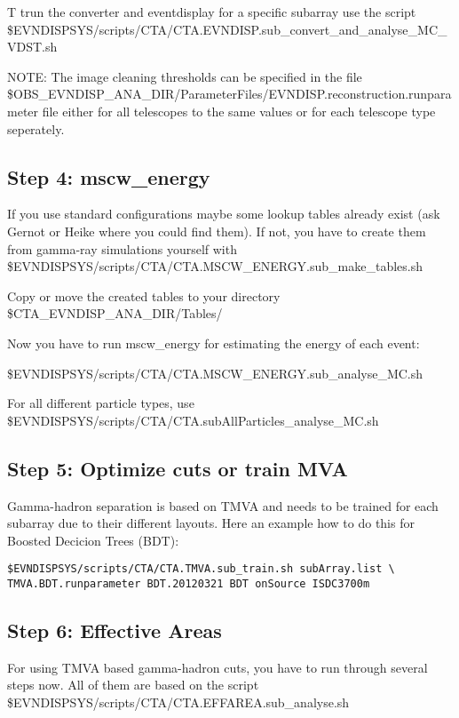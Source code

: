 \documentclass[titlepage,a4paper,twoside,11pt]{report}
\begin{document}
T trun the converter and eventdisplay for a specific subarray use the script \$EVNDISPSYS/scripts/CTA/CTA.EVNDISP.sub\_convert\_and\_analyse\_MC\_VDST.sh

NOTE: The image cleaning thresholds can be specified in the file \$OBS\_EVNDISP\_ANA\_DIR/ParameterFiles/EVNDISP.reconstruction.runparameter file either
for all telescopes to the same values or for each telescope type seperately. 

\subsection{Step 4: mscw\_energy}

If you use standard configurations maybe some lookup tables already exist (ask Gernot or Heike where you could find them).
If not, you have to create them from gamma-ray simulations yourself
with \$EVNDISPSYS/scripts/CTA/CTA.MSCW\_ENERGY.sub\_make\_tables.sh

Copy or move the created tables to your directory 
\$CTA\_EVNDISP\_ANA\_DIR/Tables/

Now you have to run mscw\_energy for estimating the energy of each
event: 

\$EVNDISPSYS/scripts/CTA/CTA.MSCW\_ENERGY.sub\_analyse\_MC.sh

For all different particle types, use 
\$EVNDISPSYS/scripts/CTA/CTA.subAllParticles\_analyse\_MC.sh

\subsection{Step 5: Optimize cuts or train MVA}

Gamma-hadron separation is based on TMVA and needs to be trained for
each subarray due to their different layouts. Here an example how to
do this for Boosted Decicion Trees (BDT):

\begin{lstlisting}
$EVNDISPSYS/scripts/CTA/CTA.TMVA.sub_train.sh subArray.list \
TMVA.BDT.runparameter BDT.20120321 BDT onSource ISDC3700m 
\end{lstlisting}

\subsection{Step 6: Effective Areas}

For using TMVA based gamma-hadron cuts, you have to run through
several steps now. All of them are based on the script
\$EVNDISPSYS/scripts/CTA/CTA.EFFAREA.sub\_analyse.sh
\end{document}
